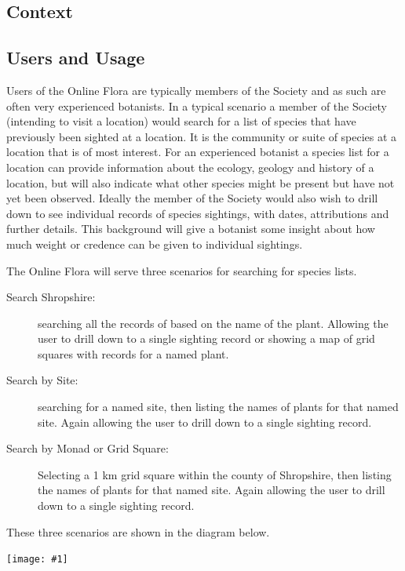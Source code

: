 \documentclass[a4paper,12pt,landscape]{article}
\newcommand{\wireframe}[1]{\texttt{[image: \#1]}\clearpage}
\begin{document}
\begin{multicols*}{2}
  \section{Context}

  \subsection{Users and Usage}
  Users of the Online Flora are typically
  members of the Society
  and
  as such are often very experienced botanists.
  In a typical scenario a member of the Society
  (intending to visit a location)
  would search for a list of species that have previously
  been sighted at a location.
  It is the community or suite of species at a location that is of most interest.
  For an experienced botanist a species list for a location
  can provide information about
  the ecology, geology and history of a location,
  but will also indicate what other species might be present but have not yet been observed.
  Ideally the member of the Society
  would also wish to drill down to see individual records of species sightings,
  with dates, attributions and further details.
  This background will give a botanist
  some insight about how much weight or credence can be given to individual sightings.

  The Online Flora will serve three scenarios for
  searching for species lists.

  \begin{description}
      \item[Search Shropshire:]
        searching all the records of based on the name of the plant.
        Allowing the user to drill down to a single sighting record
        or
        showing a map of grid squares with records for a named plant.
      \item[Search by Site:]
        searching for a named site,
        then listing the names of plants for that named site.
        Again allowing the user to drill down to a single sighting record.
      \item[Search by Monad or Grid Square:]
        Selecting a 1 km grid square within the county of Shropshire,
        then listing the names of plants for that named site.
        Again allowing the user to drill down to a single sighting record.
  \end{description}

  These three scenarios are shown in the diagram below.
  \clearpage

  \wireframe{./wireframes/Overview.png}%


\end{multicols*}
\end{document}

